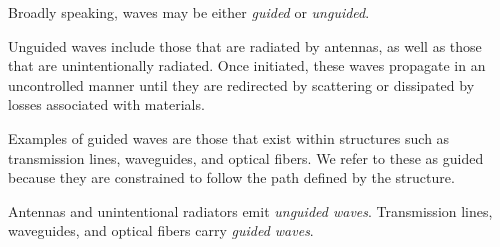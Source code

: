 

\label{m0040_Guided_vs_Unguided_Waves} %

Broadly speaking, waves may be either \emph{guided} or \emph{unguided}.

Unguided waves include those that are radiated by antennas, as well as those that are unintentionally radiated.
Once initiated, these waves propagate in an uncontrolled manner until they are redirected by scattering or dissipated by losses associated with materials.

Examples of guided waves are those that exist within structures such as transmission lines, waveguides, and optical fibers.  We refer to these as guided because they are constrained to follow the path defined by the structure.

\begin{mdframed}[backgroundcolor=yellow!20,nobreak=true]
Antennas and unintentional radiators emit \emph{unguided waves}.
Transmission lines, waveguides, and optical fibers carry \emph{guided waves}. 
\end{mdframed}

